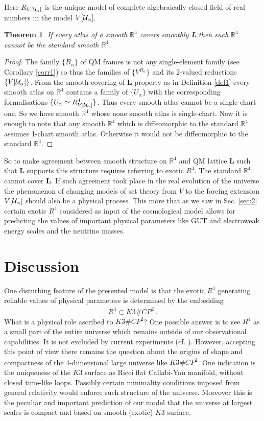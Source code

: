 \documentclass[12pt]{article}
\newtheorem{Theorem}{Theorem}
\begin{document}
Here $R_{V[{\cal U}_{\alpha}]}$ is the unique model of complete algebraically closed field of real numbers in the model $V[{\cal U}_{\alpha}]$.
\begin{Theorem}
If every atlas of a smooth $\mathbb{R}^4$ covers smoothly {\bf L} then such $\mathbb{R}^4$ cannot be the standard smooth $\mathbb{R}^4$.
\end{Theorem}
\begin{proof}
The family $\{B_{\alpha}\}$ of QM frames is not any single-element family (see Corollary \ref{corr1}) so thus the families of $\{V^{B_{\alpha}}\}$ and its 2-valued reductions $\{V[{\cal U}_{\alpha}]\}$. From the smooth covering of {\bf L} property as in Definition \ref{def1} every smooth atlas on $\mathbb{R}^4$ contains a family of $\{U_{\alpha}\}$ with the corresponding formalisations $\{U_{\alpha}\simeq R^4_{V[{\cal U}_{\alpha}]} \}$. Thus every smooth atlas cannot be a single-chart one. 
So we have smooth $\mathbb{R}^4$ whose none smooth atlas is single-chart. Now it is enough to note that any smooth $\mathbb{R}^4$ which is diffeomorphic to the standard $\mathbb{R}^4$ assumes 1-chart smooth atlas. Otherwise it would not be diffeomorphic to the standard $\mathbb{R}^4$.
\end{proof}
So to make agreement between smooth structure on $\mathbb{R}^4$ and QM lattice {\bf L} such that {\bf L} supports this structure requires referring to exotic $R^4$. The standard $\mathbb{R}^4$ cannot cover {\bf L}. If such agreement took place in the real evolution of the universe the phenomenon of changing models of set theory from $V$ to the forcing extension $V[{\cal U}_{\alpha}]$ should also be a physical process. This more that as we saw in Sec. \ref{sec:2} certain exotic $R^4$ considered as input of the cosmological model allows for predicting the values of important physical parameters like GUT and electroweak energy scales and the neutrino masses. 

\section{Discussion}
One disturbing feature of the presented model is that the exotic $R^4$ generating reliable values of physical parameters is determined by the embedding 
\[R^4\subset K3\# \overline{CP^2}\,. \] What is a physical role ascribed to $K3\# \overline{CP^2}$? One possible answer is to see $R^4$ as a small part of the entire universe which remains outside of our observational capabilities. It is not excluded by current experiments (cf. \cite{AK2018}). However, accepting this point of view there remains the question about the origins of shape and compactness of the 4-dimensional large universe like $K3\# \overline{CP^2}$. One indication is the uniqueness of the $K3$ surface as Ricci flat Callabi-Yau manifold, without closed time-like loops. Possibly certain minimality conditions imposed from general relativity would enforce such structure of the universe. Moreover this is the peculiar and important prediction of our model that the universe at largest scales is compact and based on smooth (exotic) $K3$ surface.
\end{document}
